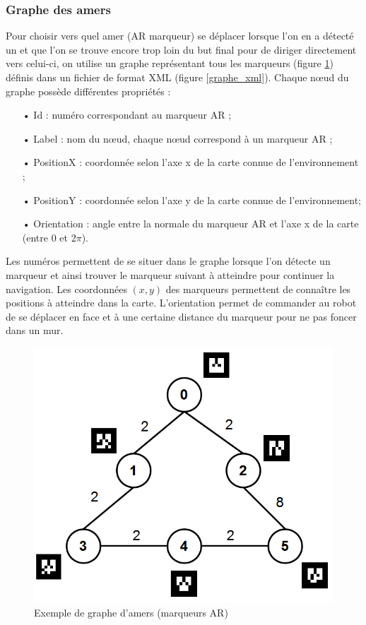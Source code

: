 \documentclass[10pt,a4paper]{article}
\begin{document}
\subsubsection{Graphe des amers}
\label{sec:grapheDesAmers}

Pour choisir vers quel amer (AR marqueur) se déplacer lorsque l'on en a détecté un et que l'on se trouve encore trop loin du but final pour de diriger directement vers celui-ci, on utilise un graphe représentant tous les marqueurs (figure \ref{graphe}) définis dans un fichier de format XML (figure \ref{graphe_xml}). Chaque nœud du graphe possède différentes propriétés : 

\begin{itemize}
\item[•] Id : numéro correspondant au marqueur AR ; 
\item[•] Label : nom du nœud, chaque nœud correspond à un marqueur AR ; 
\item[•] PositionX : coordonnée selon l'axe x de la carte connue de l'environnement ; 
\item[•] PositionY : coordonnée selon l'axe y de la carte connue de l'environnement; 
\item[•] Orientation : angle entre la normale du marqueur AR et l'axe x de la carte (entre 0 et 2$\pi$).
\end{itemize}

Les numéros permettent de se situer dans le graphe lorsque l'on détecte un marqueur et ainsi trouver le marqueur suivant à atteindre pour continuer la navigation. Les coordonnées $(x,y)$ des marqueurs permettent de connaître les positions à atteindre dans la carte. L'orientation permet de commander au robot de se déplacer en face et à une certaine distance du marqueur pour ne pas foncer dans un mur.

\begin{figure}[!h]
\centering\includegraphics[scale=0.4]{figures/graphe.png}
\caption{Exemple de graphe d'amers (marqueurs AR)}
\label{graphe}
\end{figure}
\end{document}
